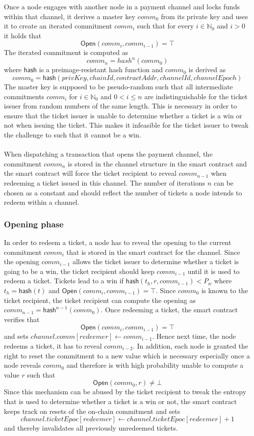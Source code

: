 Once a node engages with another node in a payment channel and locks funds within that channel, it derives a master key $comm_0$ from its private key and uses it to create an iterated commitment $comm_i$ such that for every $i \in \mathbb{N}_0$ and $i > 0$ it holds that $$ \mathsf{Open}(comm_{i}, comm_{i-1}) = \top $$
The iterated commitment is computed as $$comm_n = hash^n(comm_0)$$ where $\mathsf{hash}$ is a preimage-resistant hash function and $comm_0$ is derived as 
$$ comm_0 = \mathsf{hash}(privKey, chainId, contractAddr, channelId, channelEpoch)$$
The master key is supposed to be pseudo-random such that all intermediate commitments $comm_{i}$ for $i \in \mathbb{N}_0$ and $0 < i \le n$ are indistinguishable for the ticket issuer from random numbers of the same length. This is necessary in order to ensure that the ticket issuer is unable to determine whether a ticket is a win or not when issuing the ticket. This makes it infeasible for the ticket issuer to tweak the challenge to such that it cannot be a win.
\\~\\When dispatching a transaction that opens the payment channel, the commitment $comm_n$ is stored in the channel structure in the smart contract and the smart contract will force the ticket recipient to reveal $comm_{n-1}$ when redeeming a ticket issued in this channel.
The number of iterations $n$ can be chosen as a constant and should reflect the number of tickets a node intends to redeem within a channel.

\subsubsection{Opening phase}

In order to redeem a ticket, a node has to reveal the opening to the current commitment $comm_i$ that is stored in the smart contract for the channel. Since the opening $comm_{i-1}$ allows the ticket issuer to determine whether a ticket is going to be a win, the ticket recipient should keep $comm_{i-1}$ until it is used to redeem a ticket.
Tickets lead to a win if $\mathsf{hash}( t_h, r, comm_{i-1} ) < P_w$ where $t_h=\mathsf{hash}(t)$ and $\mathsf{Open}(comm_i, comm_{i-1}) = \top$. Since $comm_{0}$ is known to the ticket recipient, the ticket recipient can compute the opening as $comm_{n-1} = \mathsf{hash}^{n-1}(comm_0)$.
Once redeeming a ticket, the smart contract verifies that $$\mathsf{Open}(comm_i, comm_{i-1}) = \top$$ and sets $channel.comm[redeemer] \leftarrow comm_{i-1}$. Hence next time, the node redeems a ticket, it has to reveal $comm_{i-2}$.
In addition, each node is granted the right to reset the commitment to a new value which is necessary especially once a node reveals $comm_0$ and therefore is with high probability unable to compute a value $r$ such that $$\mathsf{Open}(comm_0,r) \neq \bot$$
Since this mechanism can be abused by the ticket recipient to tweak the entropy that is used to determine whether a ticket is a win or not, the smart contract keeps track on resets of the on-chain commitment and sets $$channel.ticketEpoc[redeemer] \leftarrow channel.ticketEpoc[redeemer] + 1$$ and thereby invalidates all previously unredeemed tickets.


